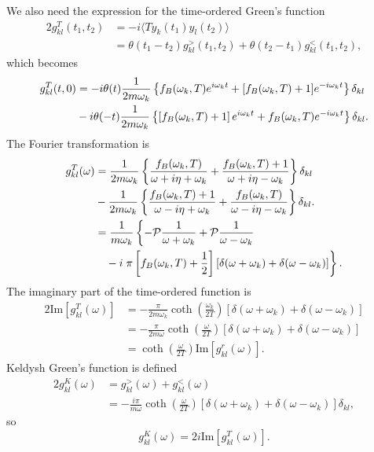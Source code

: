 We also need the expression for the time-ordered Green's function 
\begin{alignat}{2}
 g^T_{kl}(t_1,t_2) &= -i \langle T y_k(t_1)y_l(t_2) \rangle \\
  &= \theta(t_1-t_2) g^>_{kl}(t_1,t_2) + \theta(t_2-t_1) g^<_{kl}(t_1,t_2),
\end{alignat}
which becomes
\begin{alignat}{2}
 g^T_{kl}(t,0) &= -i \theta(t)\frac{1}{2m\omega_k} \left\{  f_B(\omega_k,T) e^{i\omega_k t} +  [f_B(\omega_k,T)+1] e^{-i\omega_k t}\right\} \delta_{kl} \notag \\
 &-i \theta(-t) \frac{1}{2m\omega_k}  \left\{\left[f_B(\omega_k,T)+1 \right] e^{i\omega_k t} +   f_B(\omega_k,T) e^{-i\omega_k t} \right\}  \delta_{kl}.
\end{alignat}
The Fourier transformation is
\begin{alignat}{2}
 g^T_{kl}(\omega) &= \frac{1}{2m\omega_k} \left\{\frac{f_B(\omega_k,T)}{\omega+i\eta+\omega_k} + \frac{f_B(\omega_k,T)+1}{\omega+i\eta-\omega_k}\right\}\delta_{kl} \notag \\
  & - \frac{1}{2m\omega_k} \left\{\frac{f_B(\omega_k,T)+1}{\omega-i\eta+\omega_k} + \frac{f_B(\omega_k,T)}{\omega-i\eta-\omega_k} \right\}\delta_{kl}.\\
  &= \frac{1}{m\omega_k} \left\{- \mathcal{P} \frac{1}{\omega+\omega_k} +  \mathcal{P} \frac{1}{\omega-\omega_k} \right. \\
  &\quad - i \left. \pi \left[ f_B(\omega_k,T)+\frac{1}{2} \right]\left[ \delta(\omega+\omega_k) + \delta(\omega-\omega_k)\right] \right\}.
\end{alignat}
The imaginary part of the time-ordered function is 
\begin{alignat}{2}
 \textrm{Im}[g^T_{kl}(\omega)] &=- \frac{\pi}{2m\omega_k} \coth\left(\frac{\omega_k}{2T} \right)\left[ \delta(\omega+\omega_k) + \delta(\omega-\omega_k)\right] \\
  &= - \frac{\pi}{2m\omega} \coth\left(\frac{\omega}{2T} \right)\left[ \delta(\omega+\omega_k) + \delta(\omega-\omega_k)\right] \\
  &= \coth\left(\frac{\omega}{2T} \right) \textrm{Im}[g^r_{kl}(\omega)].
\end{alignat}
Keldysh Green's function is defined 
\begin{alignat}{2}
 g^K_{kl}(\omega) &= g^>_{kl}(\omega) + g^<_{kl}(\omega)	\\
  &=- \frac{i\pi}{m\omega} \coth\left(\frac{\omega}{2T} \right) [\delta(\omega+\omega_k) + \delta(\omega-\omega_k)] \delta_{kl},
\end{alignat}
so
\begin{equation}
 g^K_{kl}(\omega) = 2i \textrm{Im}[g^T_{kl}(\omega)].
\end{equation}


